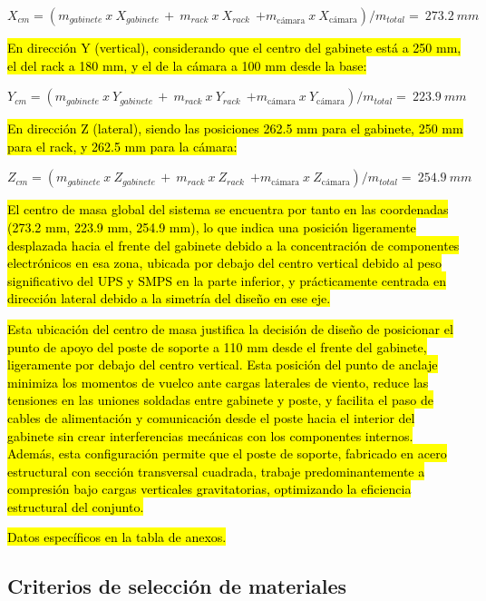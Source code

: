 \documentclass[12pt,a4paper,oneside]{report}
\begin{document}
\(X_{cm} = (m_{gabinete}\ x\ X_{gabinete\ } + \ m_{rack}\ x\ X_{rack}\ \ {+ m}_{\text{cámara}}\ x\ X_{\text{cámara}})/m_{total} = \ 273.2\ mm\ \)

\hl{En dirección Y (vertical), considerando que el centro del gabinete está a 250 mm, el del rack a 180 mm, y el de la cámara a 100 mm desde la base:}

\(Y_{cm} = (m_{gabinete}\ x\ Y_{gabinete\ } + \ m_{rack}\ x\ Y_{rack}\ \ {+ m}_{\text{cámara}}\ x\ Y_{\text{cámara}})/m_{total} = \ 223.9\ mm\ \)

\hl{En dirección Z (lateral), siendo las posiciones 262.5 mm para el gabinete, 250 mm para el rack, y 262.5 mm para la cámara:}

\(Z_{cm} = (m_{gabinete}\ x\ Z_{gabinete\ } + \ m_{rack}\ x\ Z_{rack}\ \ {+ m}_{\text{cámara}}\ x\ Z_{\text{cámara}})/m_{total} = \ 254.9\ mm\ \)

\hl{El centro de masa global del sistema se encuentra por tanto en las coordenadas (273.2 mm, 223.9 mm, 254.9 mm), lo que indica una posición ligeramente desplazada hacia el frente del gabinete debido a la concentración de componentes electrónicos en esa zona, ubicada por debajo del centro vertical debido al peso significativo del UPS y SMPS en la parte inferior, y prácticamente centrada en dirección lateral debido a la simetría del diseño en ese eje.}

\hl{Esta ubicación del centro de masa justifica la decisión de diseño de posicionar el punto de apoyo del poste de soporte a 110 mm desde el frente del gabinete, ligeramente por debajo del centro vertical. Esta posición del punto de anclaje minimiza los momentos de vuelco ante cargas laterales de viento, reduce las tensiones en las uniones soldadas entre gabinete y poste, y facilita el paso de cables de alimentación y comunicación desde el poste hacia el interior del gabinete sin crear interferencias mecánicas con los componentes internos. Además, esta configuración permite que el poste de soporte, fabricado en acero estructural con sección transversal cuadrada, trabaje predominantemente a compresión bajo cargas verticales gravitatorias, optimizando la eficiencia estructural del conjunto.}

\hl{Datos específicos en la tabla de anexos.}

\subsection{Criterios de selección de materiales}\label{criterios-de-selecciuxf3n-de-materiales}
\end{document}
